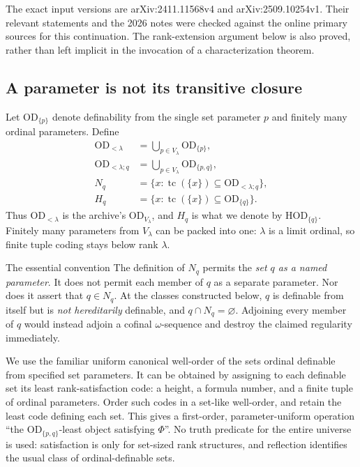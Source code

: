 \documentclass[11pt,letterpaper]{article}
\theoremstyle{definition}
\numberwithin{equation}{section}
\newcommand{\HOD}{\mathrm{HOD}}
\newcommand{\OD}{\mathrm{OD}}
\newcommand{\ODlo}{\OD_{<\lambda}}
\newcommand{\ODq}{\OD_{<\lambda;q}}
\newcommand{\tc}{\operatorname{tc}}
\newcommand{\ODone}[1]{\OD_{\{#1\}}}
\newcommand{\HODone}[1]{\HOD_{\{#1\}}}
\begin{document}
The exact input versions are arXiv:2411.11568v4 and arXiv:2509.10254v1. Their relevant statements and the 2026 notes were checked against the online primary sources for this continuation. The rank-extension argument below is also proved, rather than left implicit in the invocation of a characterization theorem.

\subsection{A parameter is not its transitive closure}\label{sec:param}

Let $\ODone{p}$ denote definability from the single set parameter $p$ and finitely many ordinal parameters. Define
\begin{align}
\ODlo&=\bigcup_{p\in V_\lambda}\ODone{p},\label{eq:odlo}\\
\ODq&=\bigcup_{p\in V_\lambda}\OD_{\{p,q\}},\label{eq:odq}\\
N_q&=\{x:\tc(\{x\})\subseteq\ODq\},\label{eq:Nq}\\
H_q&=\{x:\tc(\{x\})\subseteq\ODone{q}\}.
\label{eq:Hq}
\end{align}
Thus $\ODlo$ is the archive's $\OD_{V_\lambda}$, and $H_q$ is what we denote by $\HODone{q}$. Finitely many parameters from $V_\lambda$ can be packed into one: $\lambda$ is a limit ordinal, so finite tuple coding stays below rank $\lambda$.

\begin{assessment}{The essential convention}
The definition of $N_q$ permits the \emph{set $q$ as a named parameter}. It does not permit each member of $q$ as a separate parameter. Nor does it assert that $q\in N_q$. At the classes constructed below, $q$ is definable from itself but is \emph{not hereditarily} definable, and $q\cap N_q=\varnothing$. Adjoining every member of $q$ would instead adjoin a cofinal $\omega$-sequence and destroy the claimed regularity immediately.
\end{assessment}

We use the familiar uniform canonical well-order of the sets ordinal definable from specified set parameters. It can be obtained by assigning to each definable set its least rank-satisfaction code: a height, a formula number, and a finite tuple of ordinal parameters. Order such codes in a set-like well-order, and retain the least code defining each set. This gives a first-order, parameter-uniform operation ``the $\OD_{\{p,q\}}$-least object satisfying $\Phi$''. No truth predicate for the entire universe is used: satisfaction is only for set-sized rank structures, and reflection identifies the usual class of ordinal-definable sets.
\end{document}
